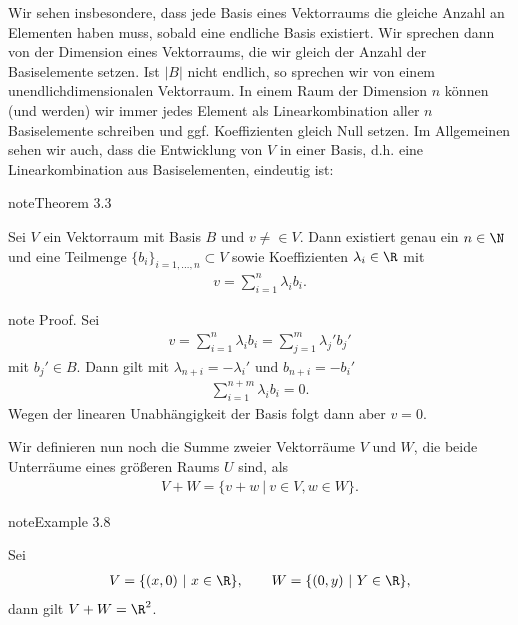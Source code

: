 \documentclass[letterpaper,10pt,english]{jupyterBook}
\begin{document}
Wir sehen insbesondere, dass jede Basis eines Vektorraums die gleiche Anzahl an Elementen haben muss, sobald eine endliche Basis existiert. Wir sprechen dann von der Dimension eines Vektorraums, die wir gleich der Anzahl der Basiselemente setzen. Ist \(|B|\) nicht endlich, so sprechen wir von einem unendlich\sphinxhyphen{}dimensionalen Vektorraum. In einem Raum der Dimension \(n\) können (und werden) wir immer jedes Element als Linearkombination aller \(n\) Basiselemente schreiben und ggf. Koeffizienten gleich Null setzen.
Im Allgemeinen sehen wir auch, dass die Entwicklung von \(V\) in einer Basis, d.h. eine Linearkombination aus Basiselementen, eindeutig ist:
\label{vektorraeume/vektorraeume:theorem-11}
\begin{sphinxadmonition}{note}{Theorem 3.3}



Sei \(V\) ein Vektorraum mit Basis \(B\) und \(v \neq \in V\). Dann existiert genau ein \(n \in \N\) und eine Teilmenge \(\{b_i\}_{i=1,\ldots,n} \subset V\) sowie Koeffizienten \(\lambda_i \in \R\) mit
\begin{equation*}
\begin{split} v =  \sum_{i=1}^n \lambda_i b_i .\end{split}
\end{equation*}\end{sphinxadmonition}

\begin{sphinxadmonition}{note}
Proof.  Sei
\begin{equation*}
\begin{split} v = \sum_{i=1}^n \lambda_i b_i = \sum_{j=1}^m \lambda_j' b_j'\end{split}
\end{equation*}
mit \(b_j' \in B\). Dann gilt mit \(\lambda_{n+i} = -\lambda_i'\) und \(b_{n+i}=-b_i'\)
\begin{equation*}
\begin{split} \sum_{i=1}^{n+m} \lambda_i b_i = 0.\end{split}
\end{equation*}
Wegen der linearen Unabhängigkeit der Basis folgt dann aber \(v=0\).
\end{sphinxadmonition}

Wir definieren nun noch die Summe zweier Vektorräume \(V\) und \(W\), die beide Unterräume eines größeren Raums \(U\) sind, als
\begin{equation*}
\begin{split} V+W = \{ v + w ~|~ v \in V, w \in W \}.\end{split}
\end{equation*}\label{vektorraeume/vektorraeume:example-12}
\begin{sphinxadmonition}{note}{Example 3.8}



Sei
\begin{equation*}
\begin{split} V= \{(x,0)~|~x \in  \R \}, \qquad W= \{(0,y)~|~Y \in  \R \},\end{split}
\end{equation*}
dann gilt  \(V+W = \R^2\).
\end{sphinxadmonition}
\end{document}

